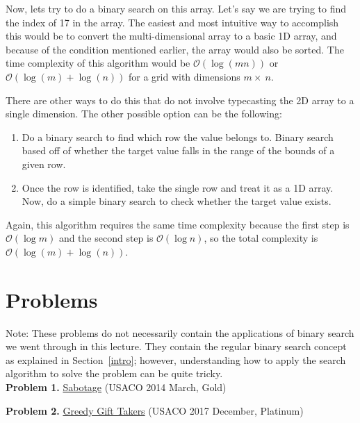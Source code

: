 \documentclass{article}
\begin{document}
Now, lets try to do a binary search on this array. Let's say we are trying to find the index of 17 in the array. The easiest and most intuitive way to accomplish this would be to convert the multi-dimensional array to a basic 1D array, and because of the condition mentioned earlier, the array would also be sorted. The time complexity of this algorithm would be $\mathcal{O}(\log(mn))$ or $\mathcal{O}(\log(m)+\log(n))$ for a grid with dimensions $m\times~n$.

There are other ways to do this that do not involve typecasting the 2D array to a single dimension. The other possible option can be the following:

\begin{enumerate}
  \item Do a binary search to find which row the value belongs to. Binary search based off of whether the target value falls in the range of the bounds of a given row.
  \item Once the row is identified, take the single row and treat it as a 1D array. Now, do a simple binary search to check whether the target value exists. 
\end{enumerate}

Again, this algorithm requires the same time complexity because the first step is $\mathcal{O}(\log{m})$ and the second step is $\mathcal{O}(\log{n})$, so the total complexity is $\mathcal{O}(\log(m)+\log(n))$. 

\section{Problems}
Note: These problems do not necessarily contain the applications of binary search we went through in this lecture. They contain the regular binary search concept as explained in Section~\ref{intro}; however, understanding how to apply the search algorithm to solve the problem can be quite tricky. \\

\noindent\textbf{Problem 1.} \href{http://usaco.org/index.php?page=viewproblem2&cpid=419}{Sabotage} (USACO 2014 March, Gold) 

\noindent\textbf{Problem 2.} \href{http://www.usaco.org/index.php?page=viewproblem2&cpid=770}{Greedy Gift Takers} (USACO 2017 December, Platinum)
\end{document}
